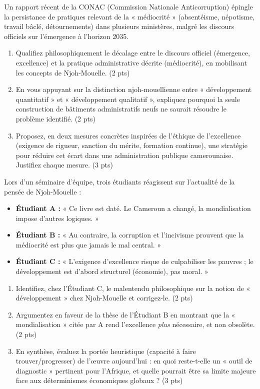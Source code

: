 \documentclass[11pt]{article}
\begin{document}
\begin{exercice}
\noindent Un rapport récent de la CONAC (Commission Nationale Anticorruption) épingle la persistance de pratiques relevant de la « médiocrité » (absentéisme, népotisme, travail bâclé, détournements) dans plusieurs ministères, malgré les discours officiels sur l'émergence à l'horizon 2035.

\begin{enumerate}
\item Qualifiez philosophiquement le décalage entre le discours officiel (émergence, excellence) et la pratique administrative décrite (médiocrité), en mobilisant les concepts de Njoh-Mouelle. (2 pts)
\item En vous appuyant sur la distinction njoh-mouellienne entre « développement quantitatif » et « développement qualitatif », expliquez pourquoi la seule construction de bâtiments administratifs neufs ne saurait résoudre le problème identifié. (2 pts)
\item Proposez, en deux mesures concrètes inspirées de l'éthique de l'excellence (exigence de rigueur, sanction du mérite, formation continue), une stratégie pour réduire cet écart dans une administration publique camerounaise. Justifiez chaque mesure. (3 pts)
\end{enumerate}
\end{exercice}

\begin{exercice}
\noindent Lors d'un séminaire d'équipe, trois étudiants réagissent sur l'actualité de la pensée de Njoh-Mouelle :
\begin{itemize}
\item \textbf{Étudiant A :} « Ce livre est daté. Le Cameroun a changé, la mondialisation impose d'autres logiques. »
\item \textbf{Étudiant B :} « Au contraire, la corruption et l'incivisme prouvent que la médiocrité est plus que jamais le mal central. »
\item \textbf{Étudiant C :} « L'exigence d'excellence risque de culpabiliser les pauvres ; le développement est d'abord structurel (économie), pas moral. »
\end{itemize}

\begin{enumerate}
\item Identifiez, chez l'Étudiant C, le malentendu philosophique sur la notion de « développement » chez Njoh-Mouelle et corrigez-le. (2 pts)
\item Argumentez en faveur de la thèse de l'Étudiant B en montrant que la « mondialisation » citée par A rend l'excellence \textit{plus} nécessaire, et non obsolète. (2 pts)
\item En synthèse, évaluez la portée heuristique (capacité à faire trouver/progresser) de l'œuvre aujourd'hui : en quoi reste-t-elle un « outil de diagnostic » pertinent pour l'Afrique, et quelle pourrait être sa limite majeure face aux déterminismes économiques globaux ? (3 pts)
\end{enumerate}
\end{exercice}
\end{document}
